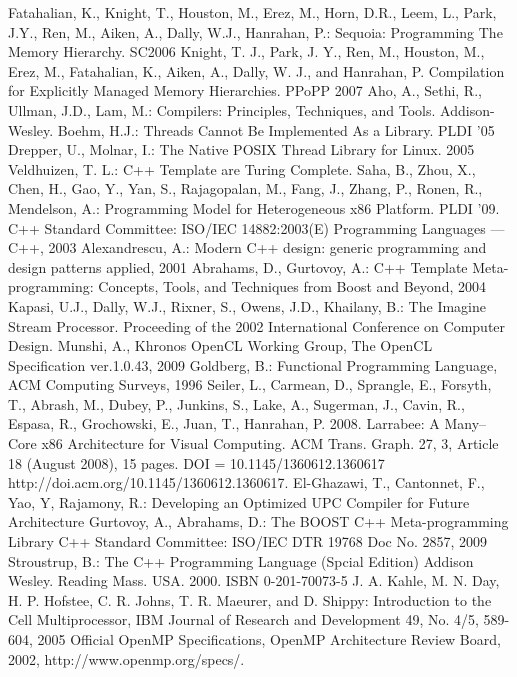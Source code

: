 \documentclass[10pt, conference, compsocconf]{IEEEtran}
\begin{document}
\begin{thebibliography}{99}
\setlength{\itemsep}{1mm}
 Fatahalian, K., Knight, T., Houston, M., Erez, M., Horn, D.R., Leem, L., Park, J.Y., Ren, M., Aiken, A., Dally, W.J., Hanrahan, P.: Sequoia: Programming The Memory Hierarchy. SC2006
 Knight, T. J., Park, J. Y., Ren, M., Houston, M., Erez, M., Fatahalian, K., Aiken, A., Dally, W. J., and Hanrahan, P. Compilation for Explicitly Managed Memory Hierarchies. PPoPP 2007
 Aho, A., Sethi, R., Ullman, J.D., Lam, M.: Compilers: Principles, Techniques, and Tools. Addison-Wesley. 
 Boehm, H.J.: Threads Cannot Be Implemented As a Library. PLDI '05
 Drepper, U., Molnar, I.: The Native POSIX Thread Library for Linux. 2005
 Veldhuizen, T. L.: C++ Template are Turing Complete. 
 Saha, B., Zhou, X., Chen, H., Gao, Y., Yan, S., Rajagopalan, M., Fang, J., Zhang, P., Ronen, R., Mendelson, A.: Programming Model for Heterogeneous x86 Platform. PLDI '09.
 C++ Standard Committee: ISO/IEC 14882:2003(E) Programming Languages — C++, 2003
 Alexandrescu, A.: Modern C++ design: generic programming and design patterns applied, 2001
 Abrahams, D., Gurtovoy, A.: C++ Template Meta-programming: Concepts, Tools, and Techniques from Boost and Beyond, 2004
 Kapasi, U.J., Dally, W.J., Rixner, S., Owens, J.D., Khailany, B.: The Imagine Stream Processor. Proceeding of the 2002 International Conference on Computer Design.
 Munshi, A., Khronos OpenCL Working Group, The OpenCL Specification ver.1.0.43, 2009
 Goldberg, B.: Functional Programming Language, ACM Computing Surveys, 1996
 Seiler, L., Carmean, D., Sprangle, E., Forsyth, T., Abrash, M., Dubey, P., Junkins, S., Lake, A., Sugerman, J., Cavin, R., Espasa, R., Grochowski, E., Juan, T., Hanrahan, P. 2008. Larrabee: A Many–Core x86 Architecture for Visual Computing. ACM Trans. Graph. 27, 3, Article 18 (August 2008), 15 pages. DOI = 10.1145/1360612.1360617 http://doi.acm.org/10.1145/1360612.1360617. 
 El-Ghazawi, T., Cantonnet, F., Yao, Y, Rajamony, R.: Developing an Optimized UPC Compiler for Future Architecture
 Gurtovoy, A., Abrahams, D.: The BOOST C++ Meta-programming Library
 C++ Standard Committee: ISO/IEC DTR 19768 Doc No. 2857, 2009
 Stroustrup, B.: The C++ Programming Language (Spcial Edition) Addison Wesley. Reading Mass. USA. 2000. ISBN 0-201-70073-5
 J. A. Kahle, M. N. Day, H. P. Hofstee, C. R. Johns, T. R. Maeurer, and D. Shippy: Introduction to the Cell Multiprocessor, IBM Journal of Research and Development 49, No. 4/5, 589-604, 2005
 Official OpenMP Specifications, OpenMP Architecture Review Board, 2002, http://www.openmp.org/specs/.
\end{thebibliography}




\end{document}
